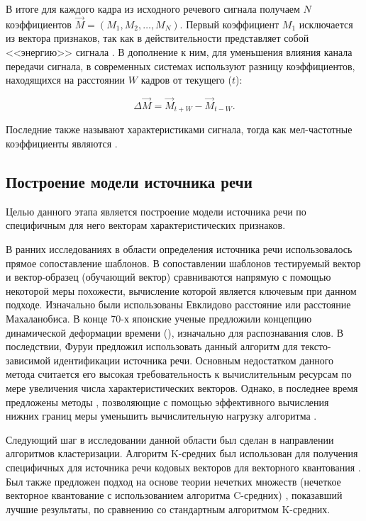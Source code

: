 В итоге для каждого кадра из исходного речевого сигнала получаем $N$ коэффициентов $\vec M = (M_1, M_2, \ldots, M_N)$. Первый коэффициент $M_1$ исключается из вектора признаков, так как в действительности представляет собой <<энергию>> сигнала \cite{Reynolds95gmm}. В дополнение к ним, для уменьшения влияния канала передачи сигнала, в современных системах используют \cite{Reynolds95gmm} разницу коэффициентов, находящихся на расстоянии $W$ кадров от текущего ($t$):

\begin{equation}
\Delta \vec M = \vec M_{t+W} - \vec M_{t-W}.
\end{equation}

Последние также называют  характеристиками сигнала, тогда как мел-частотные коэффициенты являются .

\subsection{Построение модели источника речи}

Целью данного этапа является построение модели источника речи по специфичным для него векторам характеристических признаков.

В ранних исследованиях в области определения источника речи использовалось прямое сопоставление шаблонов. В сопоставлении шаблонов тестируемый вектор и вектор-образец (обучающий вектор) сравниваются напрямую с помощью некоторой меры похожести, вычисление которой является ключевым при данном подходе. Изначально были использованы Евклидово расстояние или расстояние Махаланобиса. В конце 70-х японские ученые предложили \cite{Sakoe78DTW} концепцию динамической деформации времени (), изначально для распознавания слов. В последствии, Фуруи \cite{Furui81cepstral} предложил использовать данный алгоритм для тексто-зависимой идентификации источника речи. Основным недостатком данного метода считается его высокая требовательность к вычислительным ресурсам по мере увеличения числа характеристических векторов. Однако, в последнее время предложены методы \cite{Lemire09dtw}, позволяющие с помощью эффективного вычисления нижних границ меры уменьшить вычислительную нагрузку алгоритма .

Следующий шаг в исследовании данной области был сделан в направлении алгоритмов кластеризации. Алгоритм K-средних был использован для получения специфичных для источника речи кодовых векторов для векторного квантования \cite{Soong85VQ}. Был также предложен подход на основе теории нечетких множеств (нечеткое векторное квантование с использованием алгоритма C-средних) \cite{Bezdek78FVQ}, показавший лучшие результаты, по сравнению со стандартным алгоритмом K-средних.

